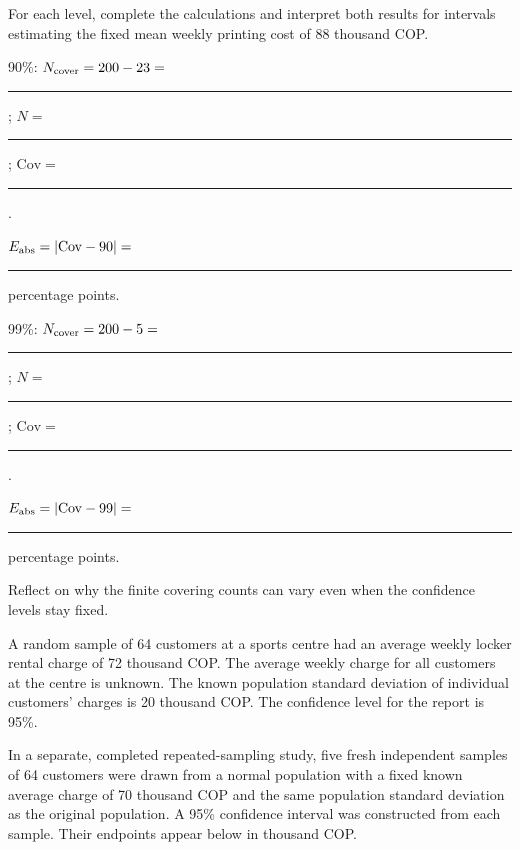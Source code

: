\clearpage
{}
\par\smallskip
\noindent\begin{minipage}[t]{.49\linewidth}
\vspace{0pt}
\end{minipage}\hfill
\begin{minipage}[t]{.49\linewidth}
\vspace{0pt}
\end{minipage}\par

\par For each level, complete the calculations and interpret both results for intervals estimating the fixed mean weekly printing cost of 88 thousand COP.
\par 90\%: $N_{\rm cover}=200-23=$ \rule{.5in}{.3pt}; $N=$ \rule{.4in}{.3pt}; $\mathrm{Cov}=$ \rule{1in}{.3pt}.
\par $E_{\rm abs}=|\mathrm{Cov}-90|=$ \rule{.7in}{.3pt} percentage points. 
\par 99\%: $N_{\rm cover}=200-5=$ \rule{.5in}{.3pt}; $N=$ \rule{.4in}{.3pt}; $\mathrm{Cov}=$ \rule{1in}{.3pt}.
\par $E_{\rm abs}=|\mathrm{Cov}-99|=$ \rule{.7in}{.3pt} percentage points. 
\par Reflect on why the finite covering counts can vary even when the confidence levels stay fixed.


A random sample of 64 customers at a sports centre had an average weekly locker rental charge of 72 thousand COP. The average weekly charge for all customers at the centre is unknown. The known population standard deviation of individual customers' charges is 20 thousand COP. The confidence level for the report is 95\%.

In a separate, completed repeated-sampling study, five fresh independent samples of 64 customers were drawn from a normal population with a fixed known average charge of 70 thousand COP and the same population standard deviation as the original population. A 95\% confidence interval was constructed from each sample. Their endpoints appear below in thousand COP.

